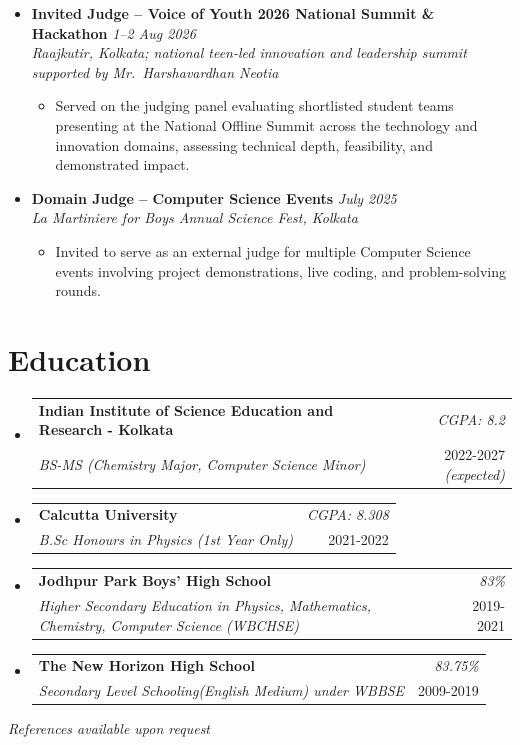 \documentclass[a4paper,10pt]{article}
\makeatletter
\newcommand{\resumeSubheading}[4]{
    \item\small{
        \begin{tabular*}{0.97\textwidth}[t]{l@{\extracolsep{\fill}}r}
            \textbf{#1} & \textit{#2} \\
            \textit{#3} & \small{#4}
        \end{tabular*}
    }\vspace{3pt}
}
\newcommand{\resumeProject}[4]{
    \item\small{
        \textbf{#1} \hfill \textit{#2}\\
        \textit{#3}\\
        \begin{itemize}[leftmargin=1.5em,label=\textbullet,nosep,itemsep=0.5pt]
            #4
        \end{itemize}
    }\vspace{2pt}
}
\newcommand{\compactSection}[2]{
    \section{#1}
    \vspace{-0.1cm}
    #2
    \vspace{-0.2cm}
}
\makeatother
\begin{document}
{\begin{itemize}[leftmargin=*,label={},itemsep=4pt]
    \resumeProject{Invited Judge -- Voice of Youth 2026 National Summit \& Hackathon}{1--2 Aug 2026}
    {Raajkutir, Kolkata; national teen-led innovation and leadership summit supported by Mr.\ Harshavardhan Neotia}
    {\item Served on the judging panel evaluating shortlisted student teams presenting at the National Offline Summit across the technology and innovation domains, assessing technical depth, feasibility, and demonstrated impact.}

    \resumeProject{Domain Judge – Computer Science Events}{July 2025}
    {La Martiniere for Boys Annual Science Fest, Kolkata}
    {
        \item Invited to serve as an external judge for multiple Computer Science events involving project demonstrations, live coding, and problem-solving rounds.
    }
\end{itemize}
}

\compactSection{Education}{
\begin{itemize}[leftmargin=*,label={},itemsep=3pt]
    \resumeSubheading{Indian Institute of Science Education and Research - Kolkata}{CGPA: 8.2}
    {BS-MS (Chemistry Major, Computer Science Minor)}{2022-2027 \textit{(expected)}}
    \vspace{-5pt}
    \resumeSubheading{Calcutta University}{CGPA: 8.308}
    {B.Sc Honours in Physics (1st Year Only)}{2021-2022}
        \vspace{-5pt}
    \resumeSubheading{Jodhpur Park Boys' High School}{83\%}
    {Higher Secondary Education in Physics, Mathematics, Chemistry, Computer Science (WBCHSE)}{2019-2021}
        \vspace{-5pt}
    \resumeSubheading{The New Horizon High School}{83.75\%}
      {Secondary Level Schooling(English Medium) under WBBSE}{2009-2019}
\end{itemize}
}


\vspace{-0.4cm}
\vspace*{\fill}
\begin{flushright}
\textit{References available upon request}
\end{flushright}
\end{document}
